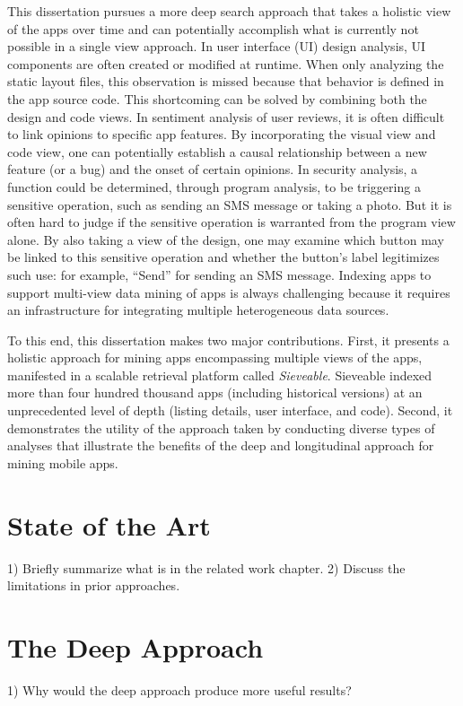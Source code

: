This dissertation pursues a more deep search approach that takes a holistic view of the apps over time and can potentially accomplish what is currently not possible in a single view approach.
In user interface (UI) design analysis, UI components are often created or modified at runtime.
When only analyzing the static layout files, this observation is missed because that behavior is defined in the app source code.
This shortcoming can be solved by combining both the design and code views.
In sentiment analysis of user reviews, it is often difficult to link opinions to specific app features.
By incorporating the visual view and code view, one can potentially establish a causal relationship between a new feature (or a bug) and the onset of certain opinions.
In security analysis, a function could be determined, through program analysis, to be triggering a sensitive operation, such as sending an SMS message or taking a photo.
But it is often hard to judge if the sensitive operation is warranted from the program view alone.
By also taking a view of the design, one may examine which button may be linked to this sensitive operation and whether the button's label legitimizes such use: for example, ``Send'' for sending an SMS message.
Indexing apps to support multi-view data mining of apps is always challenging because it requires an infrastructure for integrating multiple heterogeneous data sources.

To this end, this dissertation makes two major contributions.
First, it presents a holistic approach for mining apps encompassing multiple views of the apps, manifested in a scalable retrieval platform called \textit{Sieveable}.
Sieveable indexed more than four hundred thousand apps (including historical versions) at an unprecedented level of depth (listing details, user interface, and code).
Second, it demonstrates the utility of the approach taken by conducting diverse types of analyses that illustrate the benefits of the deep and longitudinal approach for mining mobile apps.

\section{State of the Art}

1) Briefly summarize what is in the related work chapter.
2) Discuss the limitations in prior approaches.
\pagebreak

\section{The Deep Approach}
1) Why would the deep approach produce more useful results?
\pagebreak

